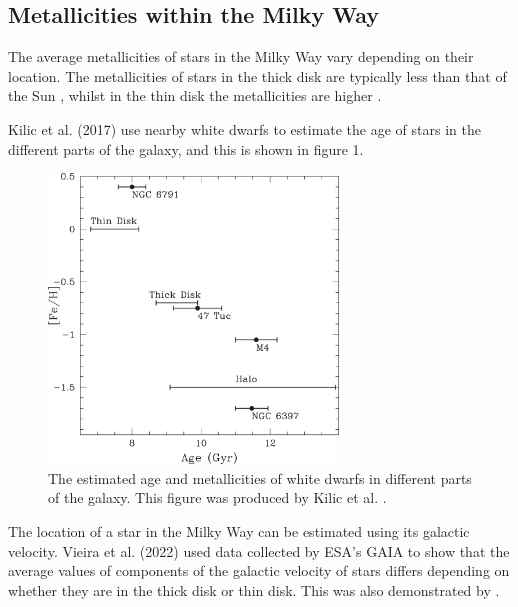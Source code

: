 \documentclass[a4paper,twocolumn,12pt]{article}
\begin{document}

\subsection{Metallicities within the Milky Way}
\label{subsection: Metallicities within the Milky Way}
The average metallicities of stars in the Milky Way vary depending on their location. The metallicities of stars in the thick disk are typically less than that of the Sun \cite{ThickDisc}, whilst in the thin disk the metallicities are higher \cite{ThinAndThickDiskKinematics}.

Kilic et al. (2017) \cite{MilkyWayMetallicitiesNearbyWDs} use nearby white dwarfs to estimate the age of stars in the different parts of the galaxy, and this is shown in figure 1.
\begin{figure}[h!]
\centering
\includegraphics[width=77mm]{apjaa62a5f10_hr.jpg}
\vspace{-2mm}
\caption{The estimated age and metallicities of white dwarfs in different parts of the galaxy. This figure was produced by Kilic et al. \cite{MilkyWayMetallicitiesNearbyWDs}.}
\label{fig: Age-metallicity for WDs}
\end{figure}

The location of a star in the Milky Way can be estimated using its galactic velocity. Vieira et al. (2022)\cite{ThinAndThickDiskKinematics} used data collected by ESA's GAIA to show that the average values of components of the galactic velocity of stars differs depending on whether they are in the thick disk or thin disk. This was also demonstrated by \cite{ThickDisc}.
\end{document}
